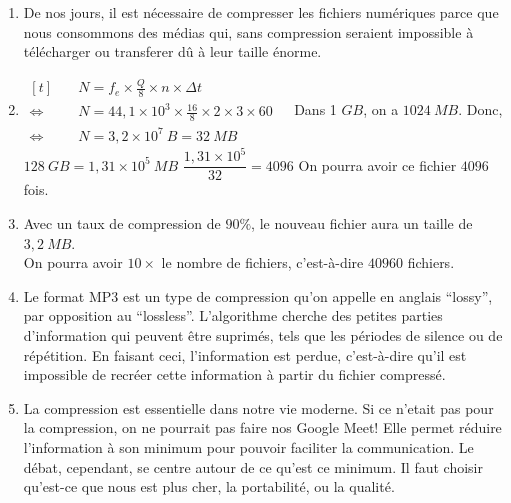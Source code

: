 \documentclass[12pt, a4paper]{article}
\begin{document}
    \begin{enumerate}[1.]
       \item   De nos jours, il est nécessaire de compresser les fichiers numériques parce que nous consommons des médias qui, sans compression seraient impossible à télécharger ou transferer dû à leur taille énorme. 
       \item    $\begin{aligned}[t]
                    &\quad N=f_e\times \frac Q8\times n\times\Delta t &\\
                    \iff&\quad N=44{,}1\times 10^3\times\frac{16}{8}\times 2\times 3\times 60 &\\
                    \iff&\quad N=3{,}2\times 10^7\ \si{B}=32\ \si{MB}
                \end{aligned}$ \medbreak
                Dans 1 $\si{GB}$, on a $1024\ \si{MB}$. Donc, $128\ \si{GB}=1{,}31\times 10^5\ \si{MB}$ \medbreak $\dfrac{1{,}31\times 10^5}{32}=4096$ \qquad On pourra avoir ce fichier $4096$ fois.
        \item   Avec un taux de compression de $90\%$, le nouveau fichier aura un taille de $3{,}2\ \si{MB}$. \\ On pourra avoir $10\times$ le nombre de fichiers, c'est-à-dire $40960$ fichiers.
        \item   Le format MP3 est un type de compression qu'on appelle en anglais ``lossy'', par opposition au ``lossless''. L'algorithme cherche des petites parties d'information qui peuvent être suprimés, tels que les périodes de silence ou de répétition. En faisant ceci, l'information est perdue, c'est-à-dire qu'il est impossible de recréer cette information à partir du fichier compressé.
        \item   La compression est essentielle dans notre vie moderne. Si ce n'etait pas pour la compression, on ne pourrait pas faire nos Google Meet! Elle permet réduire l'information à son minimum pour pouvoir faciliter la communication. Le débat, cependant, se centre autour de ce qu'est ce minimum. Il faut choisir qu'est-ce que nous est plus cher, la portabilité, ou la qualité.
    \end{enumerate}
\end{document}
